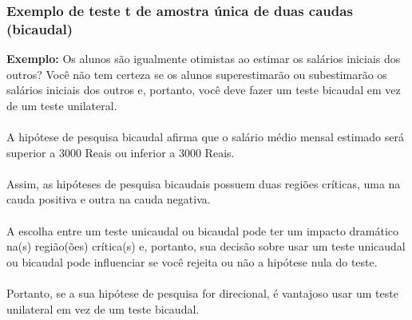 \documentclass[11pt]{beamer}
\begin{document}
\begin{frame}
\frametitle{Exemplo de teste t de amostra única de duas caudas (bicaudal)}
\textbf{Exemplo:} Os alunos são igualmente otimistas ao estimar os salários iniciais dos outros? 
Você não tem certeza se os alunos superestimarão ou subestimarão os salários iniciais dos outros e, portanto, você deve fazer um teste bicaudal em vez de um teste unilateral.\\~\\ 

A hipótese de pesquisa bicaudal afirma que o salário médio mensal estimado será superior a 3000 Reais ou inferior a 3000 Reais. \\~\\

Assim, as hipóteses de pesquisa bicaudais possuem duas regiões críticas, uma na cauda positiva e outra na cauda negativa. \\~\\

A escolha entre um teste unicaudal ou bicaudal pode ter um impacto dramático na(s) região(ões) crítica(s) e, portanto, sua decisão sobre usar um teste unicaudal ou bicaudal pode influenciar se você rejeita ou não a hipótese nula do teste. \\~\\

Portanto, se a sua hipótese de pesquisa for direcional, é vantajoso usar um teste unilateral em vez de um teste bicaudal.
\end{frame}
\end{document}
